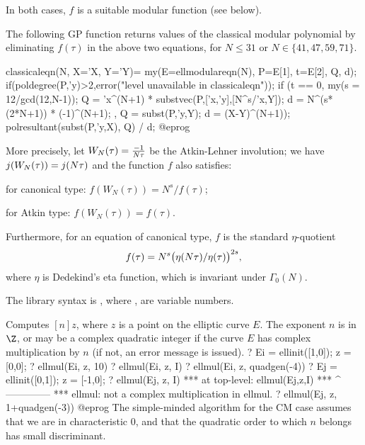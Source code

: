 \noindent In both cases, $f$ is a suitable modular function (see below).

The following GP function returns values of the classical modular polynomial
by eliminating $f(\tau)$ in the above two equations, for $N\leq 31$ or
$N\in\{41,47,59,71\}$.

\bprog
classicaleqn(N, X='X, Y='Y)=
{
  my(E=ellmodulareqn(N), P=E[1], t=E[2], Q, d);
  if(poldegree(P,'y)>2,error("level unavailable in classicaleqn"));
  if (t == 0,
    my(s = 12/gcd(12,N-1));
    Q = 'x^(N+1) * substvec(P,['x,'y],[N^s/'x,Y]);
    d = N^(s*(2*N+1)) * (-1)^(N+1);
  ,
    Q = subst(P,'y,Y);
    d = (X-Y)^(N+1));
  polresultant(subst(P,'y,X), Q) / d;
}
@eprog

More precisely, let $W_N(\tau)={{-1}\over{N\*\tau}}$ be the Atkin-Lehner
involution; we have $j(W_N(\tau)) = j(N\*\tau)$ and the function $f$ also
satisfies:

\item for canonical type:
   $f(W_N(\tau)) = N^s/f(\tau)$;

\item for Atkin type:
   $f(W_N(\tau)) = f(\tau)$.

\noindent Furthermore, for an equation of canonical type, $f$ is the standard
$\eta$-quotient
$$f(\tau) = N^s \* \big(\eta(N\*\tau) / \eta(\tau) \big)^{2\*s},$$
where $\eta$ is Dedekind's eta function, which is invariant under
$\Gamma_0(N)$.

The library syntax is , where ,  are variable numbers.

\label{se:ellmul}
Computes $[n]z$, where $z$ is a point on the elliptic curve $E$. The
exponent $n$ is in $\Z$, or may be a complex quadratic integer if the curve $E$
has complex multiplication by $n$ (if not, an error message is issued).
\bprog
? Ei = ellinit([1,0]); z = [0,0];
? ellmul(Ei, z, 10)
? ellmul(Ei, z, I)
? ellmul(Ei, z, quadgen(-4))
? Ej  = ellinit([0,1]); z = [-1,0];
? ellmul(Ej, z, I)
  ***   at top-level: ellmul(Ej,z,I)
  ***                 ^--------------
  *** ellmul: not a complex multiplication in ellmul.
? ellmul(Ej, z, 1+quadgen(-3))
@eprog
The simple-minded algorithm for the CM case assumes that we are in
characteristic $0$, and that the quadratic order to which $n$ belongs has
small discriminant.

